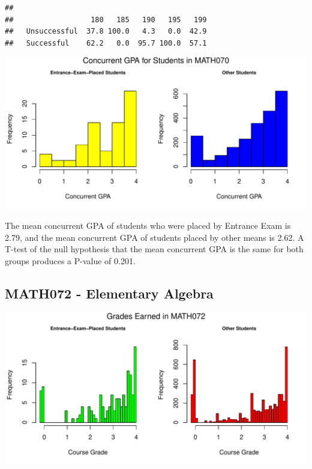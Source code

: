 \documentclass[twoside]{article}\usepackage[]{graphicx}\usepackage[]{color}
\makeatletter
\def\maxwidth{ %
  \ifdim\Gin@nat@width>\linewidth
    \linewidth
  \else
    \Gin@nat@width
  \fi
}
\newenvironment{kframe}{%
 \def\at@end@of@kframe{}%
 \ifinner\ifhmode%
  \def\at@end@of@kframe{\end{minipage}}%
  \begin{minipage}{\columnwidth}%
 \fi\fi%
 \def\FrameCommand##1{\hskip\@totalleftmargin \hskip-\fboxsep
 \colorbox{shadecolor}{##1}\hskip-\fboxsep
     \hskip-\linewidth \hskip-\@totalleftmargin \hskip\columnwidth}%
 \MakeFramed {\advance\hsize-\width
   \@totalleftmargin\z@ \linewidth\hsize
   \@setminipage}}%
 {\par\unskip\endMakeFramed%
 \at@end@of@kframe}
\newenvironment{knitrout}{}{} %
\makeatother
\begin{document}
\begin{knitrout}
\color{fgcolor}\begin{kframe}
\begin{verbatim}
##               
##                  180   185   190   195   199
##   Unsuccessful  37.8 100.0   4.3   0.0  42.9
##   Successful    62.2   0.0  95.7 100.0  57.1
\end{verbatim}
\end{kframe}
\end{knitrout}


\begin{knitrout}
\color{fgcolor}
\includegraphics[width=\maxwidth]{figure/GPAgraphs070-1} 

\end{knitrout}

The mean concurrent GPA of students who were placed by Entrance Exam is 2.79, and the mean concurrent GPA of students placed by other means is 2.62.  A T-test of the null hypothesis that the mean concurrent GPA is the same for both groups produces a P-value of 0.201.

\newpage
\subsection{MATH072 - Elementary Algebra}

\begin{knitrout}
\color{fgcolor}
\includegraphics[width=\maxwidth]{figure/graphs072-1} 

\end{knitrout}
\end{document}
